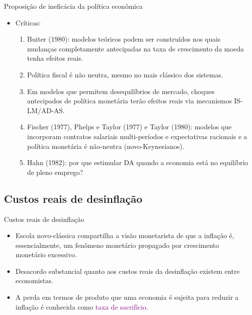\documentclass[10pt]{beamer}
\begin{document}
\begin{frame}{Proposição de ineficácia da política econômica}
    \begin{itemize}
        \item Críticas:
        \bigskip
        \begin{enumerate}
            \item Buiter (1980): modelos teóricos podem ser construídos nos quais mudanças completamente antecipadas na taxa de crescimento da moeda tenha efeitos reais.
            \bigskip
            \item Política fiscal é não neutra, mesmo no mais clássico dos sistemas.
            \bigskip
            \item Em modelos que permitem desequilíbrios de mercado, choques antecipados de política monetária terão efeitos reais via mecanismos IS-LM/AD-AS.
            \bigskip
            \item Fischer (1977), Phelps e Taylor (1977) e Taylor (1980): modelos que incorporam contratos salariais multi-períodos e expectativas racionais e a política monetária é não-neutra (novo-Keynesianos).
            \bigskip
            \item Hahn (1982): por que estimular DA quando a economia está no equilíbrio de pleno emprego?
        \end{enumerate}
    \end{itemize}
\end{frame}

\subsection{Custos reais de desinflação}
\begin{frame}{Custos reais de desinflação}
    \begin{itemize}
        \item Escola novo-clássica compartilha a visão monetarista de que a inflação é, essencialmente, um fenômeno monetário propagado por crescimento monetário excessivo.
        \bigskip
        \item Desacordo substancial quanto aos custos reais da desinflação existem entre economistas.
        \bigskip
        \item A perda em termos de produto que uma economia é sujeita para reduzir a inflação é conhecida como \textcolor{purple}{taxa de sacrifício}.
    \end{itemize}
\end{frame}
\end{document}
